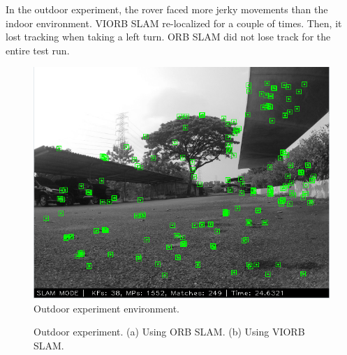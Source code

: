 In the outdoor experiment, the rover faced more jerky movements than the 	indoor environment. VIORB SLAM re-localized for a couple of times. Then, it lost tracking when taking a left turn. ORB SLAM did not lose track for the entire test run.

\begin{figure}[h]
	\centering
	\includegraphics[width=5in]{figures/demo3_screen}
	\caption[Outdoor experiment environment]{\small 
		Outdoor experiment environment. }
	\label{fig:outdoor-experiment-live}
\end{figure}


\begin{figure}[h]
	
	\centering
	\caption[Outdoor experiment.]{\small 
		Outdoor experiment. (a) Using ORB SLAM. (b) Using VIORB SLAM.}
	\label{fig:outdoor-path-visualization}
	
\end{figure}

